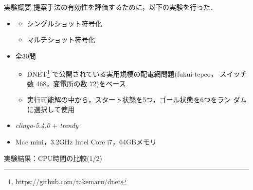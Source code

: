 \documentclass[dvipdfmx,11pt]{beamer}
\begin{document}
\begin{frame}{実験概要}
  \renewcommand{\thefootnote}{\fnsymbol{footnote}}
  \setcounter{footnote}{1}
  提案手法の有効性を評価するために，以下の実験を行った．
  \vfill
  \begin{itemize}
  \item {}
    \begin{itemize}
    \item シングルショット符号化
    \item マルチショット符号化
    \end{itemize}
  \item {} 全30問
    \begin{itemize}
    \item DNET\footnote{https://github.com/takemaru/dnet}
      で公開されている実用規模の配電網問題(\textsf{fukui-tepco}，
      スイッチ数 468，変電所の数 72)をベース
    \item 実行可能解の中から，スタート状態を5つ，ゴール状態を6つをラン
      ダムに選択して使用
    \end{itemize}
  \item {} \textit{clingo-5.4.0} $+$ \textit{trendy}
  \item {} Mac mini，3.2GHz Intel Core i7，64GBメモリ
  \end{itemize}
\end{frame}
\begin{frame}{実験結果：CPU時間の比較(1/2)}
 \centering
 \scalebox{0.8}{}
\end{frame}
\end{document}
